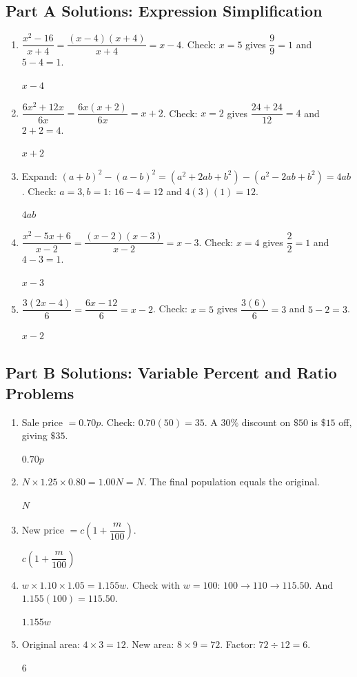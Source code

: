 \documentclass[14pt]{extarticle}
\begin{document}
\subsection*{Part A Solutions: Expression Simplification}
\begin{enumerate}
  \item \(\dfrac{x^2 - 16}{x + 4} = \dfrac{(x-4)(x+4)}{x+4} = x - 4\). Check: \(x = 5\) gives \(\dfrac{9}{9} = 1\) and \(5 - 4 = 1\).

  \(\boxed{x - 4}\)

  \item \(\dfrac{6x^2 + 12x}{6x} = \dfrac{6x(x + 2)}{6x} = x + 2\). Check: \(x = 2\) gives \(\dfrac{24 + 24}{12} = 4\) and \(2 + 2 = 4\).

  \(\boxed{x + 2}\)

  \item Expand: \((a+b)^2 - (a-b)^2 = (a^2 + 2ab + b^2) - (a^2 - 2ab + b^2) = 4ab\). Check: \(a=3, b=1\): \(16 - 4 = 12\) and \(4(3)(1) = 12\).

  \(\boxed{4ab}\)

  \item \(\dfrac{x^2 - 5x + 6}{x - 2} = \dfrac{(x-2)(x-3)}{x-2} = x - 3\). Check: \(x = 4\) gives \(\dfrac{2}{2} = 1\) and \(4 - 3 = 1\).

  \(\boxed{x - 3}\)

  \item \(\dfrac{3(2x - 4)}{6} = \dfrac{6x - 12}{6} = x - 2\). Check: \(x = 5\) gives \(\dfrac{3(6)}{6} = 3\) and \(5 - 2 = 3\).

  \(\boxed{x - 2}\)
\end{enumerate}

\subsection*{Part B Solutions: Variable Percent and Ratio Problems}
\begin{enumerate}
  \item Sale price \(= 0.70p\). Check: \(0.70(50) = 35\). A \(30\%\) discount on \(\$50\) is \(\$15\) off, giving \(\$35\).

  \(\boxed{0.70p}\)

  \item \(N \times 1.25 \times 0.80 = 1.00N = N\). The final population equals the original.

  \(\boxed{N}\)

  \item New price \(= c\left(1 + \dfrac{m}{100}\right)\).

  \(\boxed{c\!\left(1 + \dfrac{m}{100}\right)}\)

  \item \(w \times 1.10 \times 1.05 = 1.155w\). Check with \(w = 100\): \(100 \to 110 \to 115.50\). And \(1.155(100) = 115.50\).

  \(\boxed{1.155w}\)

  \item Original area: \(4 \times 3 = 12\). New area: \(8 \times 9 = 72\). Factor: \(72 \div 12 = 6\).

  \(\boxed{6}\)
\end{enumerate}
\end{document}
